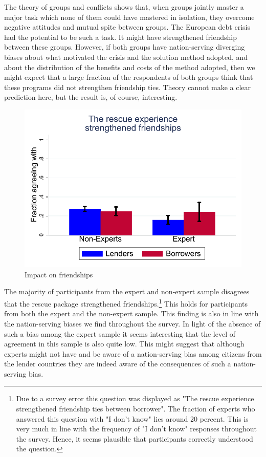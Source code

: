 The theory of groups and conflicts shows that, when groups jointly master a major task which none of them could have mastered in isolation, they overcome negative attitudes and mutual spite between groups. The European debt crisis had the potential to be 
such a task. It might have strengthened friendship between these groups.
However, if both groups have nation-serving diverging biases about what
motivated the crisis and the solution method adopted, and about the
distribution of the benefits and costs of the method adopted, then we might
expect that a large fraction of the respondents of both groups think that
these programs did not strengthen friendship ties. Theory cannot make a
clear prediction here, but the result is, of course, interesting.
\begin{figure}
\centering
\caption{Impact on friendships}
\includegraphics[scale=0.5]{graph5_3.pdf}
\end{figure}

The majority of participants from the expert and non-expert sample disagrees that 
the rescue package strengthened friendships.\footnote{Due to a survey error this question was displayed as "The rescue experience strengthened friendship ties between borrower". The fraction of experts who answered this question with "I don't know" lies around 20 percent. This is very much in line with the frequency of "I don't know" responses throughout the survey. Hence, it seems plausible that participants correctly understood the question. } This holds for participants from 
both the expert and the non-expert sample. This finding is also in line with the nation-serving biases
we find throughout the survey. In light of the absence of such a bias among the expert sample 
it seems interesting that the level of agreement in this sample is also quite low. 
This might suggest that although experts might not have and be aware of a nation-serving bias
among citizens from the lender countries they are indeed aware of the consequences of such 
a nation-serving bias. 
\\

